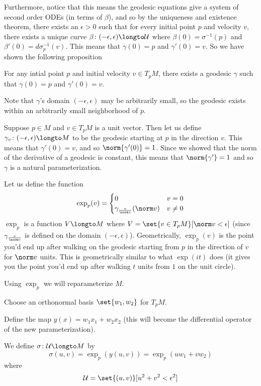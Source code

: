 Furthermore, notice that this means the geodesic equations give a system of second order ODEs (in terms of $\beta$), and so by the uniqueness and existence theorem, there exists an $\epsilon>0$ such that for
every initial point $p$ and velocity $v$, there exists a unique curve $\beta\colon(-\epsilon,\epsilon)\longto\mU$ where $\beta(0)=\sigma^{-1}(p)$ and $\beta'(0)=d\sigma_p^{-1}(v)$.
This means that $\gamma(0)=p$ and $\gamma'(0)=v$.
So we have shown the following proposition

\begin{prop*}

    For any intial point $p$ and initial velocity $v\in T_pM$, there exists a geodesic $\gamma$ such that $\gamma(0)=p$ and $\gamma'(0)=v$.

\end{prop*}

Note that $\gamma$'s domain $(-\epsilon,\epsilon)$ may be arbitrarily small, so the geodesic exists within an arbitrarily small neighborhood of $p$.

Suppose $p\in M$ and $v\in T_pM$ is a unit vector.
Then let us define $\gamma_v\colon(-\epsilon,\epsilon)\longto M$ to be the geodesic starting at $p$ in the direction $v$.
This means that $\gamma'(0)=v$, and so $\norm{\gamma'(0)}=1$.
Since we showed that the norm of the derivative of a geodesic is constant, this means that $\norm{\gamma'}=1$ and so $\gamma$ is a natural parameterization.

Let us define the function
\[ \exp_p(v) = \begin{cases} 0 & v=0 \\ \gamma_{\frac v{\norm v}}(\norm v) & v\neq0 \end{cases} \]
$\exp_p$ is a function $V\longto M$ where $V=\set{v\in T_pM}[\norm v<\epsilon]$ (since $\gamma_{\frac v{\norm v}}$ is defined on the domain $(-\epsilon,\epsilon)$).
Geometrically, $\exp_p(v)$ is the point you'd end up after walking on the geodesic starting from $p$ in the direction of $v$ for $\norm v$ units.
This is geometrically similar to what $\exp(it)$ does (it gives you the point you'd end up after walking $t$ units from $1$ on the unit circle).

Using $\exp_p$ we will reparameterize $M$.
\benum
    \item Choose an orthonormal basis $\set{w_1,w_2}$ for $T_pM$.
    \item Define the map $y(x)=w_1x_1+w_2x_2$ (this will become the differential operator of the new parameterization).
    \item We define $\sigma\colon\mU\longto M$ by
    \[ \sigma(u,v) = \exp_p(y(u,v)) = \exp_p(uw_1+vw_2) \]
    where
    \[ \mU =\set{(u,v)}[u^2+v^2<\epsilon^2] \]
\eenum

